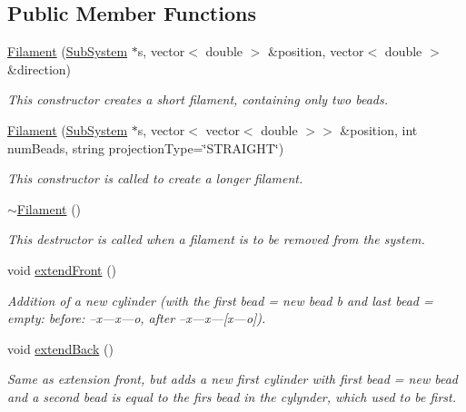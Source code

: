 \subsection*{Public Member Functions}
\begin{DoxyCompactItemize}
\item 
\hyperlink{classFilament_ad22c23046909ccd25aa3f5686ddcb7ca}{Filament} (\hyperlink{classSubSystem}{Sub\+System} $\ast$s, vector$<$ double $>$ \&position, vector$<$ double $>$ \&direction)
\begin{DoxyCompactList}\small\item\em This constructor creates a short filament, containing only two beads. \end{DoxyCompactList}\item 
\hyperlink{classFilament_a67bd4429c04b55ba15d33e005575d246}{Filament} (\hyperlink{classSubSystem}{Sub\+System} $\ast$s, vector$<$ vector$<$ double $>$$>$ \&position, int num\+Beads, string projection\+Type=\char`\"{}S\+T\+R\+A\+I\+G\+H\+T\char`\"{})
\begin{DoxyCompactList}\small\item\em This constructor is called to create a longer filament. \end{DoxyCompactList}\item 
\hyperlink{classFilament_ad3eab5cdf55ee70950c858f1950482e2}{$\sim$\+Filament} ()
\begin{DoxyCompactList}\small\item\em This destructor is called when a filament is to be removed from the system. \end{DoxyCompactList}\item 
void \hyperlink{classFilament_ad9eaad54c47ca8cf1a410925c4f68382}{extend\+Front} ()
\begin{DoxyCompactList}\small\item\em Addition of a new cylinder (with the first bead = new bead b and last bead = empty\+: before\+: --x---x---o, after --x---x---\mbox{[}x---o\mbox{]}). \end{DoxyCompactList}\item 
void \hyperlink{classFilament_a8e813887acd983efd12bf50e47698ffe}{extend\+Back} ()
\begin{DoxyCompactList}\small\item\em Same as extension front, but adds a new first cylinder with first bead = new bead and a second bead is equal to the firs bead in the cylynder, which used to be first. \end{DoxyCompactList}\item 
$$
\end{DoxyCompactItemize}
